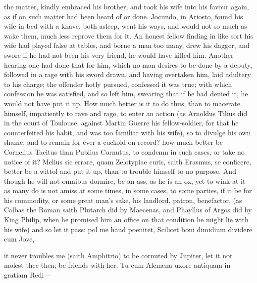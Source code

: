 {the matter, kindly embraced his brother, and took his wife into his
favour again, as if on such matter had been heard of or done. Jocundo,
in Ariosto, found his wife in bed with a knave, both asleep, went his
ways, and would not so much as wake them, much less reprove them for
it. An honest fellow finding in like sort his wife had played
false at tables, and borne a man too many, drew his dagger, and swore
if he had not been his very friend, he would have killed him. Another
hearing one had done that for him, which no man desires to be done by a
deputy, followed in a rage with his sword drawn, and having overtaken
him, laid adultery to his charge; the offender hotly pursued, confessed
it was true; with which confession he was satisfied, and so left him,
swearing that if he had denied it, he would not have put it up. How
much better is it to do thus, than to macerate himself, impatiently to
rave and rage, to enter an action (as Arnoldus Tilius did in the court
of Toulouse, against Martin Guerre his fellow-soldier, for that he
counterfeited his habit, and was too familiar with his wife), so to
divulge his own shame, and to remain for ever a cuckold on record? how
much better be Cornelius Tacitus than Publius Cornutus, to condemn in
such cases, or take no notice of it? Melius sic errare, quam Zelotypiae
curis, saith Erasmus, se conficere, better be a wittol and put it up,
than to trouble himself to no purpose. And though he will not omnibus
dormire, be an ass, as he is an ox, yet to wink at it as many do is not
amiss at some times, in some cases, to some parties, if it be for his
commodity, or some great man's sake, his landlord, patron, benefactor,
(as Calbas the Roman saith Plutarch did by Maecenas, and Phayllus
of Argos did by King Philip, when he promised him an office on that
condition he might lie with his wife) and so let it pass:
pol me haud poenitet,
Scilicet boni dimidium dividere cum Jove,

it never troubles me (saith Amphitrio) to be cornuted by Jupiter, let
it not molest thee then; be friends with her;
Tu cum Alcmena uxore antiquam in gratiam
Redi---

}
